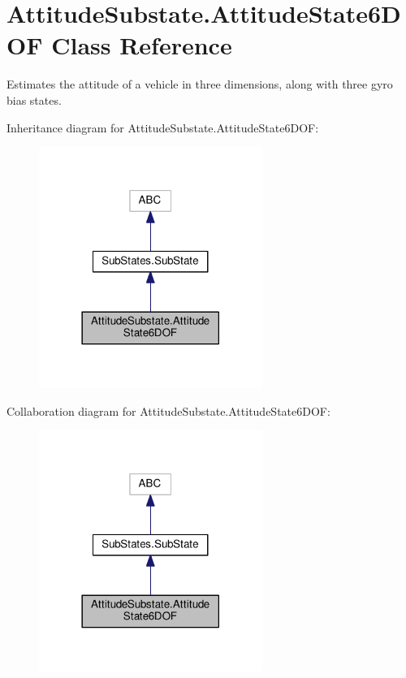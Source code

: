 \hypertarget{classAttitudeSubstate_1_1AttitudeState6DOF}{}\section{Attitude\+Substate.\+Attitude\+State6\+D\+OF Class Reference}
\label{classAttitudeSubstate_1_1AttitudeState6DOF}


Estimates the attitude of a vehicle in three dimensions, along with three gyro bias states.  




Inheritance diagram for Attitude\+Substate.\+Attitude\+State6\+D\+OF\+:\nopagebreak
\begin{figure}[H]
\begin{center}
\leavevmode
\includegraphics[width=206pt]{classAttitudeSubstate_1_1AttitudeState6DOF__inherit__graph}
\end{center}
\end{figure}


Collaboration diagram for Attitude\+Substate.\+Attitude\+State6\+D\+OF\+:\nopagebreak
\begin{figure}[H]
\begin{center}
\leavevmode
\includegraphics[width=206pt]{classAttitudeSubstate_1_1AttitudeState6DOF__coll__graph}
\end{center}
\end{figure}
